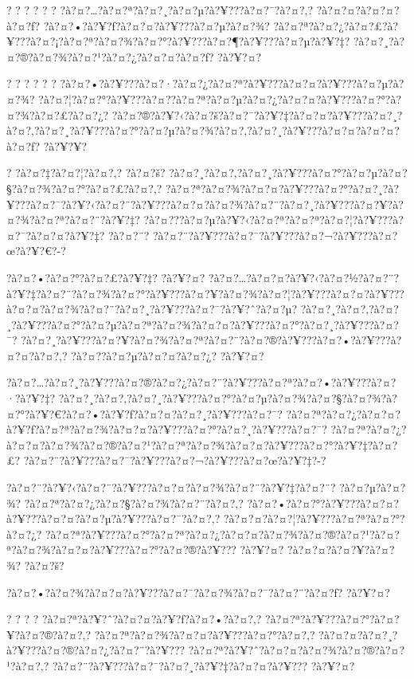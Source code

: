 \documentclass[11pt, openany]{book}
\begin{document}
{{{{{{{{{{{{{{{{{? ? ? ? ? ? ?à?¤?\ldots{}?à?¤?ª?à?¤?¸?à?¤?µ?à?¥???à?¤?¯?à?¤?‚?
?à?¤?¤?à?¤?¤?à?¤?ƒ? ?à?¤?•?à?¥?ƒ?à?¤?¤?à?¥???à?¤?µ?à?¤?¾?
?à?¤?ª?à?¤?¿?à?¤?£?à?¥???à?¤?¡?à?¤?ª?à?¤?¾?à?¤?°?à?¥???à?¤?¶?à?¥???à?¤?µ?à?¥?‡?
?à?¤?¸?à?¤?®?à?¤?¾?à?¤?¹?à?¤?¿?à?¤?¤?à?¤?ƒ? ?à?¥?¤?

? ? ? ? ? ?
?à?¤?•?à?¥???à?¤?·?à?¤?¿?à?¤?ª?à?¥???à?¤?¤?à?¥???à?¤?µ?à?¤?¾?
?à?¤?¦?à?¤?°?à?¥???à?¤?­?à?¤?ª?à?¤?µ?à?¤?¿?à?¤?¤?à?¥???à?¤?°?à?¤?¾?à?¤?£?à?¤?¿?
?à?¤?®?à?¥?‹?à?¤?š?à?¤?¯?à?¥?‡?à?¤?¤?à?¥???à?¤?¸?à?¤?‚?à?¤?¸?à?¥???à?¤?°?à?¤?µ?à?¤?¾?à?¤?‚?à?¤?¸?à?¥???à?¤?¤?à?¤?¤?à?¤?ƒ?
?à?¥?¥?

? ?à?¤?‡?à?¤?¦?à?¤?‚? ?à?¤?š?
?à?¤?¸?à?¤?‚?à?¤?¸?à?¥???à?¤?°?à?¤?µ?à?¤?§?à?¤?¾?à?¤?°?à?¤?£?à?¤?‚?
?à?¤?ª?à?¤?¾?à?¤?¤?à?¥???à?¤?°?à?¤?¸?à?¥???à?¤?¯?à?¥?‹?à?¤?¨?à?¥???à?¤?¤?à?¤?¾?à?¤?¨?à?¤?¸?à?¥???à?¤?¥?à?¤?¾?à?¤?ª?à?¤?¨?à?¥?‡?
?à?¤???à?¤?µ?à?¥?‹?à?¤?ª?à?¤?ª?à?¤?¦?à?¥???à?¤?¯?à?¤?¤?à?¥?‡? ?à?¤?¨?
?à?¤?¨?à?¥???à?¤?¯?à?¥???à?¤?¬?à?¥???à?¤?œ?à?¥?€?-?

?à?¤?•?à?¤?°?à?¤?£?à?¥?‡? ?à?¥?¤?
?à?¤?\ldots{}?à?¤?¤?à?¥?‹?à?¤?½?à?¤?¨?à?¥?‡?à?¤?¨?à?¤?¾?à?¤?°?à?¥???à?¤?¥?à?¤?¾?à?¤?¦?à?¥???à?¤?¤?à?¥???à?¤?¤?à?¤?¾?à?¤?¨?à?¤?¸?à?¥???à?¤?¯?à?¥?ˆ?à?¤?µ?
?à?¤?¸?à?¤?‚?à?¤?¸?à?¥???à?¤?°?à?¤?µ?à?¤?ª?à?¤?¾?à?¤?¤?à?¥???à?¤?°?à?¤?¸?à?¥???à?¤?¯?
?à?¤?¸?à?¥???à?¤?¥?à?¤?¾?à?¤?ª?à?¤?¨?à?¤?®?à?¥???à?¤?•?à?¥???à?¤?¤?à?¤?‚?
?à?¤?­?à?¤?µ?à?¤?¤?à?¤?¿? ?à?¥?¤?

?à?¤?\ldots{}?à?¤?¸?à?¥???à?¤?®?à?¤?¿?à?¤?¨?à?¥???à?¤?ª?à?¤?•?à?¥???à?¤?·?à?¥?‡?
?à?¤?¸?à?¤?‚?à?¤?¸?à?¥???à?¤?°?à?¤?µ?à?¤?¾?à?¤?§?à?¤?¾?à?¤?°?à?¥?€?à?¤?•?à?¥?ƒ?à?¤?¤?à?¤?¸?à?¥???à?¤?¯?
?à?¤?ª?à?¤?¿?à?¤?¤?à?¥?ƒ?à?¤?ª?à?¤?¾?à?¤?¤?à?¥???à?¤?°?à?¤?¸?à?¥???à?¤?¯?
?à?¤?ª?à?¤?¿?à?¤?¤?à?¤?¾?à?¤?®?à?¤?¹?à?¤?ª?à?¤?¾?à?¤?¤?à?¥???à?¤?°?à?¥?‡?à?¤?£?
?à?¤?¨?à?¥???à?¤?¯?à?¥???à?¤?¬?à?¥???à?¤?œ?à?¥?‡?-?

?à?¤?¨?à?¥?‹?à?¤?¨?à?¥???à?¤?¤?à?¤?¾?à?¤?¨?à?¥?‡?à?¤?¨? ?à?¤?µ?à?¤?¾?
?à?¤?ª?à?¤?¿?à?¤?§?à?¤?¾?à?¤?¨?à?¤?‚?
?à?¤?•?à?¤?°?à?¥???à?¤?¤?à?¥???à?¤?¤?à?¤?µ?à?¥???à?¤?¯?à?¤?‚?
?à?¤?¤?à?¤?¦?à?¥???à?¤?ª?à?¤?°?à?¤?¿?
?à?¤?ª?à?¥???à?¤?°?à?¤?ª?à?¤?¿?à?¤?¤?à?¤?¾?à?¤?®?à?¤?¹?à?¤?ª?à?¤?¾?à?¤?¤?à?¥???à?¤?°?à?¤?®?à?¥???
?à?¥?¤? ?à?¤?¤?à?¤?¥?à?¤?¾? ?à?¤?š?

?à?¤?•?à?¤?¾?à?¤?¤?à?¥???à?¤?¯?à?¤?¾?à?¤?¯?à?¤?¨?à?¤?ƒ? ?à?¥?¤?

? ? ? ? ?à?¤?ª?à?¥?ˆ?à?¤?¤?à?¥?ƒ?à?¤?•?à?¤?‚?
?à?¤?ª?à?¥???à?¤?°?à?¤?¥?à?¤?®?à?¤?‚?
?à?¤?ª?à?¤?¾?à?¤?¤?à?¥???à?¤?°?à?¤?‚?
?à?¤?¤?à?¤?¸?à?¥???à?¤?®?à?¤?¿?à?¤?¨?à?¥???
?à?¤?ª?à?¥?ˆ?à?¤?¤?à?¤?¾?à?¤?®?à?¤?¹?à?¤?‚?
?à?¤?¨?à?¥???à?¤?¯?à?¤?¸?à?¥?‡?à?¤?¤?à?¥??? ?à?¥?¤?

}}}}}}}}}}}}}}}}}
\end{document}

